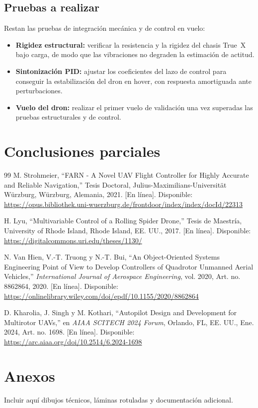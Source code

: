 \documentclass[12pt, letterpaper]{report}
\begin{document}
\subsection{Pruebas a realizar}
Restan las pruebas de integración mecánica y de control en vuelo:

\begin{itemize}
    \item \textbf{Rigidez estructural:} verificar la resistencia y la rigidez del chasis True~X bajo carga, de modo que las vibraciones no degraden la estimación de actitud.

    \item \textbf{Sintonización PID:} ajustar los coeficientes del lazo de control para conseguir la estabilización del dron en hover, con respuesta amortiguada ante perturbaciones.

    \item \textbf{Vuelo del dron:} realizar el primer vuelo de validación una vez superadas las pruebas estructurales y de control.
\end{itemize}

\section{Conclusiones parciales}




\begin{thebibliography}{99}
     M. Strohmeier, ``FARN - A Novel UAV Flight Controller for Highly Accurate and Reliable Navigation,'' Tesis Doctoral, Julius-Maximilians-Universität Würzburg, Würzburg, Alemania, 2021. [En línea]. Disponible: \url{https://opus.bibliothek.uni-wuerzburg.de/frontdoor/index/index/docId/22313}

     H. Lyu, ``Multivariable Control of a Rolling Spider Drone,'' Tesis de Maestría, University of Rhode Island, Rhode Island, EE. UU., 2017. [En línea]. Disponible: \url{https://digitalcommons.uri.edu/theses/1130/}

     N. Van Hien, V.-T. Truong y N.-T. Bui, ``An Object-Oriented Systems Engineering Point of View to Develop Controllers of Quadrotor Unmanned Aerial Vehicles,'' \textit{International Journal of Aerospace Engineering}, vol. 2020, Art. no. 8862864, 2020. [En línea]. Disponible: \url{https://onlinelibrary.wiley.com/doi/epdf/10.1155/2020/8862864}

     D. Kharolia, J. Singh y M. Kothari, ``Autopilot Design and Development for Multirotor UAVs,'' en \textit{AIAA SCITECH 2024 Forum}, Orlando, FL, EE. UU., Ene. 2024, Art. no. 1698. [En línea]. Disponible: \url{https://arc.aiaa.org/doi/10.2514/6.2024-1698}
\end{thebibliography}

\appendix
\renewcommand{\thesection}{\Alph{section}}
\setcounter{section}{0}
\section{Anexos}
Incluir aquí dibujos técnicos, láminas rotuladas y documentación adicional.
\end{document}
